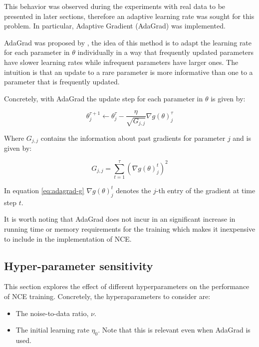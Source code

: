 This behavior was observed during the experiments with real data to be presented in later sections, therefore an adaptive learning rate was sought for this problem. In particular, Adaptive Gradient (AdaGrad) was implemented.

AdaGrad was proposed by \citet{Duchi2011adagrad}, the idea of this method is to adapt the learning rate for each parameter in $\theta$ individually in a way that frequently updated parameters have slower learning rates while infrequent parameters have larger ones. The intuition is that an update to a rare parameter is more informative than one to a parameter that is frequently updated.

Concretely, with AdaGrad the update step for each parameter in $\theta$ is given by:

\begin{equation}
  \theta^{\tau + 1}_{j} \leftarrow \theta^{\tau}_{j} - \frac{\eta}{\sqrt{G_{j,j}}} \nabla g(\theta)^{\tau}_{j}
\end{equation}

Where $G_{j,j}$ contains the information about past gradients for parameter $j$ and is given by:

\begin{equation}
  G_{j,j} = \sum_{t=1}^{\tau} \left(\nabla g(\theta)^{t}_{j}\right)^{2}
  \label{eq:adagrad-g}
\end{equation}

In equation \ref{eq:adagrad-g} $\nabla g(\theta)^{t}_{j}$ denotes the $j$-th entry of the gradient at time step $t$.

It is worth noting that AdaGrad does not incur in an significant increase in running time or memory requirements for the training which makes it inexpensive to include in the implementation of NCE.

\subsection{Hyper-parameter sensitivity}

This section explores the effect of different hyperparameters on the performance of NCE training. Concretely, the hyperaparameters to consider are:

\begin{itemize}
  \item The noise-to-data ratio, $\nu$.
  \item The initial learning rate $\eta_{0}$. Note that this is relevant even when AdaGrad is used.
\end{itemize}

